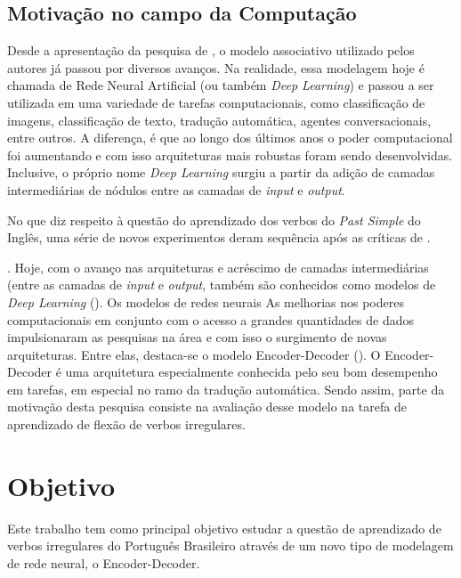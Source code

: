 \subsection{Motivação no campo da Computação}

Desde a apresentação da pesquisa de \cite{rumelhart:1986}, o modelo associativo utilizado pelos autores já passou por diversos avanços. Na realidade, essa  modelagem hoje é chamada de Rede Neural Artificial (ou também \textit{Deep Learning}) e passou a ser utilizada em uma variedade de tarefas computacionais, como classificação de imagens, classificação de texto, tradução automática, agentes conversacionais, entre outros. A diferença, é que ao longo dos últimos anos o poder computacional foi aumentando e com isso arquiteturas mais robustas foram sendo desenvolvidas. Inclusive, o próprio nome \textit{Deep Learning} surgiu a partir da adição de camadas intermediárias de nódulos entre as camadas de \textit{input} e \textit{output}. 

No que diz respeito à questão do aprendizado dos verbos do \textit{Past Simple} do Inglês, uma série de novos experimentos deram sequência após as críticas de \cite{Pinker:1988}. 

. Hoje, com o avanço nas arquiteturas e acréscimo de camadas intermediárias (entre as camadas de \textit{input} e \textit{output}, também são conhecidos como modelos de \textit{Deep Learning} (\cite{Goodfellow-et-al-2016}). Os modelos de redes neurais 
As melhorias nos poderes computacionais em conjunto com o acesso a grandes quantidades de dados impulsionaram as pesquisas na área e com isso o surgimento de novas arquiteturas. Entre elas, destaca-se o modelo Encoder-Decoder (\cite{enc-dec:2014}). O Encoder-Decoder é uma arquitetura especialmente conhecida pelo seu bom desempenho em tarefas, em especial no ramo da tradução automática. Sendo assim, parte da motivação desta pesquisa consiste na avaliação desse modelo na tarefa de aprendizado de flexão de verbos irregulares. 


\section{Objetivo}
\label{sec:objectives}

Este trabalho tem como principal objetivo estudar a questão de aprendizado de verbos irregulares do Português Brasileiro através de um novo tipo de modelagem de rede neural, o Encoder-Decoder. 

